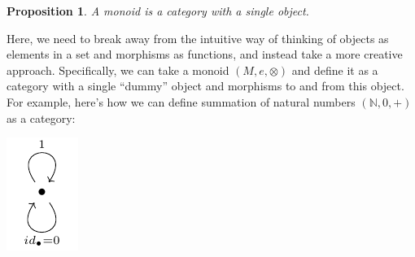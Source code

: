 \documentclass[
]{book}
\newtheorem{proposition}{Proposition}[chapter]
\theoremstyle{definition}
\theoremstyle{definition}
\theoremstyle{definition}
\theoremstyle{definition}
\theoremstyle{remark}
\begin{document}
\begin{proposition}
A monoid is a category with a single object.
\end{proposition}

Here, we need to break away from the intuitive way of thinking of objects as elements in a set and morphisms as functions, and instead take a more creative approach. Specifically, we can take a monoid \((M, e, \otimes)\) and define it as a category with a single ``dummy'' object and morphisms to and from this object. For example, here's how we can define summation of natural numbers \((\mathbb{N}, 0, +)\) as a category:

\begin{center}\includegraphics[width=1\linewidth,height=1\textheight]{./figures/monoid-category} \end{center}
\end{document}
